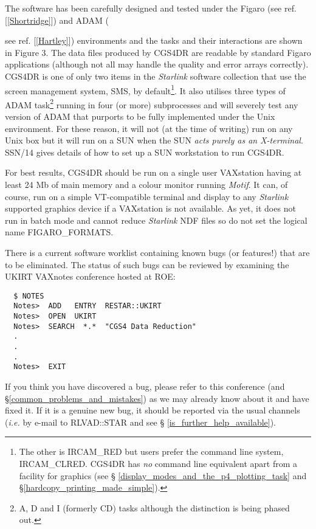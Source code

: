 The software has been carefully designed and tested under the Figaro (see ref.
[\ref{Shortridge}]) and ADAM ({see ref. [\ref{Hartley}]) environments and the
tasks and their interactions are shown in Figure 3. 
The data files produced by CGS4DR are readable by standard 
Figaro applications (although not all may handle the quality and error arrays 
correctly). CGS4DR is one of only two items in the {\sl Starlink} software 
collection that use the screen management system, SMS, by default\footnote{The 
other is IRCAM\_RED but users prefer
the command line system, IRCAM\_CLRED. CGS4DR has {\em no} command line
equivalent apart from a facility for graphics (see  \S
\ref{display_modes_and_the_p4_plotting_task} and
\S \ref{hardcopy_printing_made_simple}).}. 
It also utilises three types of ADAM task\footnote{A, D and I (formerly CD)
tasks although the distinction is being phased out.} running in four (or more)
subprocesses and will severely test any version of ADAM that purports to be 
fully implemented under the Unix environment. For these reason, it will not 
(at the time of writing) run on any Unix box but it will run on a SUN
when the SUN {\em acts purely as an X-terminal}. SSN/14 gives details of 
how to set up a SUN workstation to run CGS4DR.

For best results, CGS4DR should be run on a single user VAXstation having
at least 24 Mb of main memory and a colour monitor running {\em Motif}. It
can, of course, run on a simple VT-compatible terminal and display to any 
{\sl Starlink} supported graphics device if a VAXstation is not available. 
As yet, it does not run in batch mode and cannot reduce {\sl Starlink} NDF 
files so do not set the logical name FIGARO\_FORMATS.

There is a current software worklist containing known bugs (or features!) that 
are to be eliminated. The status of such bugs can be reviewed by
examining the UKIRT VAXnotes conference hosted at ROE:

\begin{verbatim}
  $ NOTES
  Notes>  ADD   ENTRY  RESTAR::UKIRT
  Notes>  OPEN  UKIRT
  Notes>  SEARCH  *.*  "CGS4 Data Reduction"
  .
  .
  .
  Notes>  EXIT
\end{verbatim}

If you think you have discovered a bug, please refer to this conference
(and \S \ref{common_problems_and_mistakes}) as we may already know about it
and have fixed it. If it is a genuine new bug, it should be reported via the
usual channels ({\em i.e.} by e-mail to {\sf RLVAD::STAR} and see \S 
\ref{is_further_help_available}).

}
